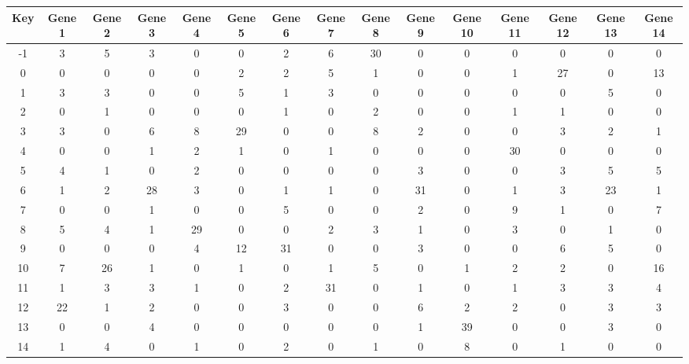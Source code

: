 \begin{tabular}{|c|c|c|c|c|c|c|c|c|c|c|c|c|c|c|}
\hline
Key & Gene 1 & Gene 2 & Gene 3 & Gene 4 & Gene 5 & Gene 6 & Gene 7 & Gene 8 & Gene 9 & Gene 10 & Gene 11 & Gene 12 & Gene 13 & Gene 14 \\
\hline
-1 & 3 & 5 & 3 & 0 & 0 & 2 & 6 & 30 & 0 & 0 & 0 & 0 & 0 & 0 \\
0 & 0 & 0 & 0 & 0 & 2 & 2 & 5 & 1 & 0 & 0 & 1 & 27 & 0 & 13 \\
1 & 3 & 3 & 0 & 0 & 5 & 1 & 3 & 0 & 0 & 0 & 0 & 0 & 5 & 0 \\
2 & 0 & 1 & 0 & 0 & 0 & 1 & 0 & 2 & 0 & 0 & 1 & 1 & 0 & 0 \\
3 & 3 & 0 & 6 & 8 & 29 & 0 & 0 & 8 & 2 & 0 & 0 & 3 & 2 & 1 \\
4 & 0 & 0 & 1 & 2 & 1 & 0 & 1 & 0 & 0 & 0 & 30 & 0 & 0 & 0 \\
5 & 4 & 1 & 0 & 2 & 0 & 0 & 0 & 0 & 3 & 0 & 0 & 3 & 5 & 5 \\
6 & 1 & 2 & 28 & 3 & 0 & 1 & 1 & 0 & 31 & 0 & 1 & 3 & 23 & 1 \\
7 & 0 & 0 & 1 & 0 & 0 & 5 & 0 & 0 & 2 & 0 & 9 & 1 & 0 & 7 \\
8 & 5 & 4 & 1 & 29 & 0 & 0 & 2 & 3 & 1 & 0 & 3 & 0 & 1 & 0 \\
9 & 0 & 0 & 0 & 4 & 12 & 31 & 0 & 0 & 3 & 0 & 0 & 6 & 5 & 0 \\
10 & 7 & 26 & 1 & 0 & 1 & 0 & 1 & 5 & 0 & 1 & 2 & 2 & 0 & 16 \\
11 & 1 & 3 & 3 & 1 & 0 & 2 & 31 & 0 & 1 & 0 & 1 & 3 & 3 & 4 \\
12 & 22 & 1 & 2 & 0 & 0 & 3 & 0 & 0 & 6 & 2 & 2 & 0 & 3 & 3 \\
13 & 0 & 0 & 4 & 0 & 0 & 0 & 0 & 0 & 1 & 39 & 0 & 0 & 3 & 0 \\
14 & 1 & 4 & 0 & 1 & 0 & 2 & 0 & 1 & 0 & 8 & 0 & 1 & 0 & 0 \\
\hline
\end{tabular}